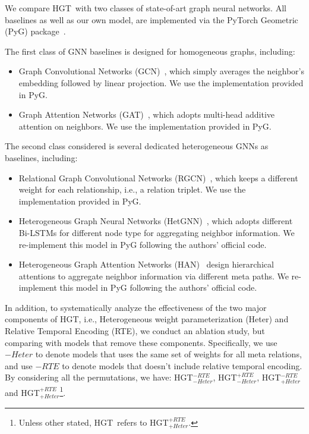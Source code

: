 \documentclass[sigconf]{acmart}
\theoremstyle{definition}
\newcommand{\short}{HGT}
\begin{document}
We compare \short\ with two classes of state-of-art graph neural networks. 
All baselines as well as our own model, 
are implemented via the PyTorch Geometric (PyG) package~\cite{pyG}. 


 The first class of GNN baselines is designed for homogeneous graphs, including:
\begin{itemize}
    \item Graph Convolutional Networks (GCN)~\cite{gcn}, which simply averages the neighbor's embedding followed by linear projection. We use the implementation provided in PyG.
    \item Graph Attention Networks (GAT)~\cite{gat}, which adopts multi-head additive attention on neighbors. We use the implementation provided in PyG. 
\end{itemize}

The second class considered is several dedicated heterogeneous GNNs as baselines,  including: \begin{itemize}
    \item Relational Graph Convolutional Networks (RGCN)~\cite{DBLP:conf/esws/SchlichtkrullKB18}, which keeps a different weight for each relationship, i.e., a relation triplet. We use the implementation provided in PyG.
    \item Heterogeneous Graph Neural Networks (HetGNN)~\cite{DBLP:conf/kdd/ZhangSHSC19}, which adopts different Bi-LSTMs for different node type for aggregating neighbor information. We re-implement this model in PyG following the authors' official code.
    \item Heterogeneous Graph Attention Networks (HAN)~\cite{DBLP:conf/www/WangJSWYCY19} design hierarchical attentions to aggregate neighbor information via different meta paths. We re-implement this model in PyG following the authors' official code.
\end{itemize}

In addition, to systematically analyze the effectiveness of the two major components of \short, i.e., Heterogeneous weight parameterization (Heter) and Relative Temporal Encoding (RTE), we conduct an ablation study, but comparing with models that remove these components. Specifically, we use $-Heter$ to denote models that uses the same set of weights for all meta relations, and use $-RTE$ to denote models that doesn't include relative temporal encoding. By considering all the permutations, we have: \short$_{-Heter}^{-RTE}$, \short$_{-Heter}^{+RTE}$, \short$_{+Heter}^{-RTE}$ and \short$_{+Heter}^{+RTE}$\footnote{Unless other stated, \short\ refers to \short$_{+Heter}^{+RTE}$.}.
\end{document}
